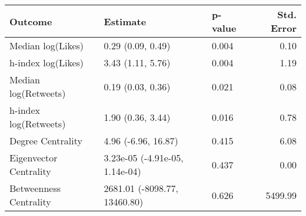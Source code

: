 \begin{table}[ht]
\centering
\begin{tabular}{lllr}
  \hline
Outcome & Estimate & p-value & Std. Error \\ 
  \hline
Median log(Likes) & 0.29 (0.09, 0.49) & 0.004 & 0.10 \\ 
  h-index log(Likes) & 3.43 (1.11, 5.76) & 0.004 & 1.19 \\ 
  Median log(Retweets) & 0.19 (0.03, 0.36) & 0.021 & 0.08 \\ 
  h-index log(Retweets) & 1.90 (0.36, 3.44) & 0.016 & 0.78 \\ 
  Degree Centrality & 4.96 (-6.96, 16.87) & 0.415 & 6.08 \\ 
  Eigenvector Centrality & 3.23e-05 (-4.91e-05, 1.14e-04) & 0.437 & 0.00 \\ 
  Betweenness Centrality & 2681.01 (-8098.77, 13460.80) & 0.626 & 5499.99 \\ 
   \hline
\end{tabular}
\end{table}
